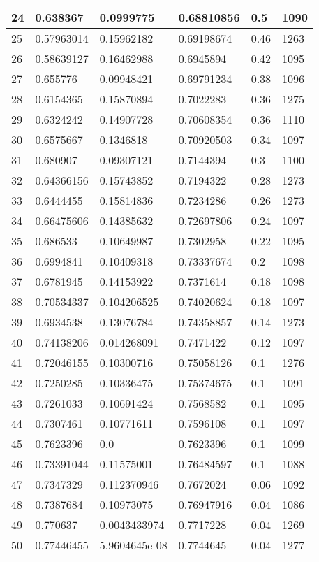 \begin{longtable}{|l|l|l|l|l|l|}
24 & 0.638367 & 0.0999775 & 0.68810856 & 0.5 & 1090 \\ \hline 
25 & 0.57963014 & 0.15962182 & 0.69198674 & 0.46 & 1263 \\ \hline 
26 & 0.58639127 & 0.16462988 & 0.6945894 & 0.42 & 1095 \\ \hline 
27 & 0.655776 & 0.09948421 & 0.69791234 & 0.38 & 1096 \\ \hline 
28 & 0.6154365 & 0.15870894 & 0.7022283 & 0.36 & 1275 \\ \hline 
29 & 0.6324242 & 0.14907728 & 0.70608354 & 0.36 & 1110 \\ \hline 
30 & 0.6575667 & 0.1346818 & 0.70920503 & 0.34 & 1097 \\ \hline 
31 & 0.680907 & 0.09307121 & 0.7144394 & 0.3 & 1100 \\ \hline 
32 & 0.64366156 & 0.15743852 & 0.7194322 & 0.28 & 1273 \\ \hline 
33 & 0.6444455 & 0.15814836 & 0.7234286 & 0.26 & 1273 \\ \hline 
34 & 0.66475606 & 0.14385632 & 0.72697806 & 0.24 & 1097 \\ \hline 
35 & 0.686533 & 0.10649987 & 0.7302958 & 0.22 & 1095 \\ \hline 
36 & 0.6994841 & 0.10409318 & 0.73337674 & 0.2 & 1098 \\ \hline 
37 & 0.6781945 & 0.14153922 & 0.7371614 & 0.18 & 1098 \\ \hline 
38 & 0.70534337 & 0.104206525 & 0.74020624 & 0.18 & 1097 \\ \hline 
39 & 0.6934538 & 0.13076784 & 0.74358857 & 0.14 & 1273 \\ \hline 
40 & 0.74138206 & 0.014268091 & 0.7471422 & 0.12 & 1097 \\ \hline 
41 & 0.72046155 & 0.10300716 & 0.75058126 & 0.1 & 1276 \\ \hline 
42 & 0.7250285 & 0.10336475 & 0.75374675 & 0.1 & 1091 \\ \hline 
43 & 0.7261033 & 0.10691424 & 0.7568582 & 0.1 & 1095 \\ \hline 
44 & 0.7307461 & 0.10771611 & 0.7596108 & 0.1 & 1097 \\ \hline 
45 & 0.7623396 & 0.0 & 0.7623396 & 0.1 & 1099 \\ \hline 
46 & 0.73391044 & 0.11575001 & 0.76484597 & 0.1 & 1088 \\ \hline 
47 & 0.7347329 & 0.112370946 & 0.7672024 & 0.06 & 1092 \\ \hline 
48 & 0.7387684 & 0.10973075 & 0.76947916 & 0.04 & 1086 \\ \hline 
49 & 0.770637 & 0.0043433974 & 0.7717228 & 0.04 & 1269 \\ \hline 
50 & 0.77446455 & 5.9604645e-08 & 0.7744645 & 0.04 & 1277 \\ \hline 
\end{longtable}